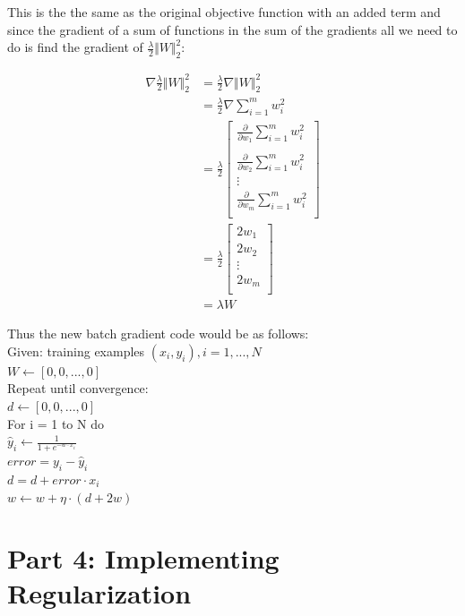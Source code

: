 \documentclass{article}
\newcommand\tab[1][1cm]{\hspace*{#1}}
\begin{document}
	This is the the same as the original objective function with an added term and since the gradient of a sum of functions in the sum of the gradients all we need to do is find the gradient of $\frac{\lambda}{2} \Vert W \Vert_{2}^{2}$:
	
	\begin{align}
	\nabla \frac{\lambda}{2} \Vert W \Vert_{2}^{2} &= \frac{\lambda}{2} \nabla \Vert W \Vert_{2}^{2} \\
	 &= \frac{\lambda}{2} \nabla \sum_{i = 1}^{m} w_{i}^{2} \\
	 &= \frac{\lambda}{2} \begin{bmatrix}
		 \frac{\partial}{\partial w_{1}} \sum_{i = 1}^{m} w_{i}^{2} \\ \\
		 \frac{\partial}{\partial w_{2}} \sum_{i = 1}^{m} w_{i}^{2} \\
		 \vdots \\
		 \frac{\partial}{\partial w_{m}} \sum_{i = 1}^{m} w_{i}^{2} \\
		 \end{bmatrix}\\
	&= \frac{\lambda}{2} \begin{bmatrix}
	2 w_{1} \\
	2 w_{2} \\
	\vdots \\
	2 w_{m} \\
	 \end{bmatrix}\\
	&= \lambda W
	\end{align}
	
Thus the new batch gradient code would be as follows:\\
Given: training examples $(x_{i}, y_{i}), i = 1, ..., N$ \\
$W \leftarrow [0, 0, ..., 0]$ \\
Repeat until convergence: \\
\tab $ d \leftarrow [0, 0, ..., 0]$ \\
\tab For i = 1 to N do \\
\tab \tab $\hat{y}_{i} \leftarrow \frac{1}{1 + e^{-w \cdot x_{i}}}$ \\
\tab \tab $error = y_{i} - \hat{y}_{i}$ \\
\tab \tab $d = d + error \cdot x_{i}$ \\
\tab $w \leftarrow w + \eta \cdot (d + 2 w)$
		


	
	\section*{Part 4: Implementing Regularization}
	
\end{document}

